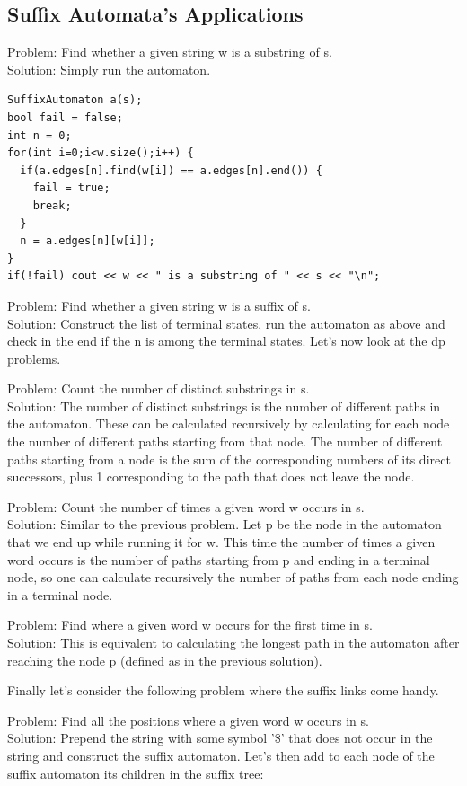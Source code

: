 \documentclass[a4paper,13pt]{article}
\begin{document}
\subsection{Suffix Automata's Applications}
Problem: Find whether a given string w is a substring of s.\\
Solution: Simply run the automaton.
\begin{verbatim}
SuffixAutomaton a(s);
bool fail = false;
int n = 0;
for(int i=0;i<w.size();i++) {
  if(a.edges[n].find(w[i]) == a.edges[n].end()) {
    fail = true;
    break;
  }
  n = a.edges[n][w[i]];
}
if(!fail) cout << w << " is a substring of " << s << "\n";
\end{verbatim}

Problem: Find whether a given string w is a suffix of s.\\
Solution: Construct the list of terminal states, run the automaton as above and check in the end if the n is among the terminal states.
Let's now look at the dp problems.

Problem: Count the number of distinct substrings in s.\\
Solution: The number of distinct substrings is the number of different paths in the automaton. These can be calculated recursively by calculating for each node the number of different paths starting from that node. The number of different paths starting from a node is the sum of the corresponding numbers of its direct successors, plus 1 corresponding to the path that does not leave the node.

Problem: Count the number of times a given word w occurs in s.\\
Solution: Similar to the previous problem. Let p be the node in the automaton that we end up while running it for w. This time the number of times a given word occurs is the number of paths starting from p and ending in a terminal node, so one can calculate recursively the number of paths from each node ending in a terminal node.

Problem: Find where a given word w occurs for the first time in s.\\
Solution: This is equivalent to calculating the longest path in the automaton after reaching the node p (defined as in the previous solution).

Finally let's consider the following problem where the suffix links come handy.

Problem: Find all the positions where a given word w occurs in s.\\
Solution: Prepend the string with some symbol '\$' that does not occur in the string and construct the suffix automaton. Let's then add to each node of the suffix automaton its children in the suffix tree:
\end{document}
